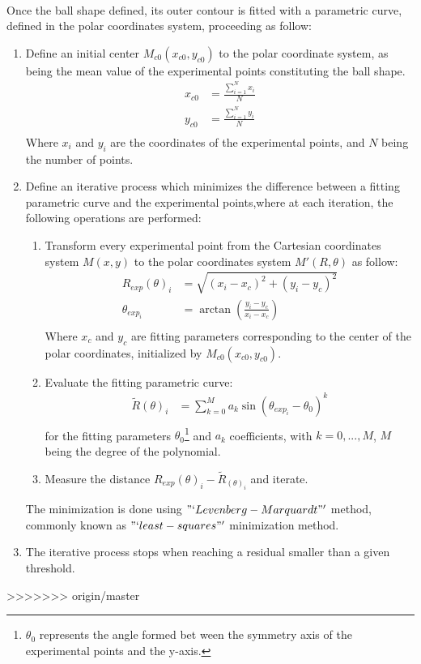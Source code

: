 \paragraph{}
Once the ball shape defined, its outer contour is fitted with a parametric curve, defined in the polar coordinates system, proceeding as follow:
\begin{enumerate}
	\item Define an initial center 	$M_{c0} (x_{c0},y_{c0})$	to the polar coordinate system, as being the mean value of the experimental points constituting the ball shape.
	\begin{align*}
			x_{c0} &= \frac{\sum\limits_{i=1}^N x_i}{N} \\
			y_{c0} &= \frac{\sum\limits_{i=1}^N y_i}{N} \\
	\end{align*}
	Where $x_i$ and $y_i$	are the coordinates of the experimental points, and	$N$	being the number of points.
	\item Define an iterative process which minimizes the difference between a fitting parametric curve and the experimental points,where at each iteration, the 		following operations are performed: 
	
		\begin{enumerate}[label=\alph*)]
			\item Transform every experimental point from the Cartesian coordinates system  $M(x,y)$ to the polar coordinates system $M'(R,\theta)$  as follow:
				\begin{align*}
				R_{exp}(\theta)_i &=\sqrt{(x_i- x_c)^2+(y_i-y_c)^2}  \\
				\theta_{exp_i} &= \arctan(\frac{y_i-y_c}{x_i- x_c}) \\
				\end{align*}
				Where $x_c$ and $y_c$ are fitting parameters corresponding to the center of the polar coordinates, initialized by $M_{c0} (x_{c0},y_{c0})$.
			\item Evaluate the fitting parametric curve:
				\begin{align*}
					\tilde{R}(\theta)_i &=\sum\limits_{k=0}^M a_k \sin(\theta_{exp_i}-\theta_0)^k  \\
				\end{align*}
				for the fitting parameters $\theta_0$\footnote{$\theta_0$ represents the angle formed bet ween the symmetry axis of the experimental points and the y-axis.} 			 and $a_k$ coefficients, with $k={0,...,M}$, $M$ being the degree of the polynomial.
			\item Measure the distance $R_{exp}(\theta)_i-\tilde{R}_(\theta)_i$ and iterate.
		\end{enumerate}
	The minimization is done using $"`Levenberg-Marquardt"'$ method, commonly known as $"`least-squares"'$ minimization method.
	\item The iterative process stops when reaching a residual smaller than a given threshold.	
\end{enumerate}
>>>>>>> origin/master
